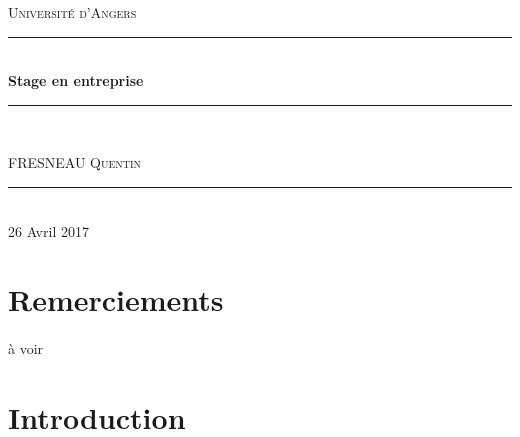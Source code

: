 \documentclass[a4paper,12pt]{extarticle}
\newcommand{\HRule}{\rule{\linewidth}{0.5mm}}
\begin{document}
\begin{titlepage}
  \begin{sffamily}
  \begin{center}


    \textsc{\LARGE Université d'Angers}\\[2cm]

   

    \HRule \\[0.4cm]
    { \huge \bfseries Stage en entreprise}{\bfseries  \\[0.4cm] }

    \HRule \\[2cm]
    

    \begin{minipage}{0.4\textwidth}
      \begin{flushleft} \large
        FRESNEAU \textsc{Quentin}
      \end{flushleft}
    \end{minipage}
    

    \vfill
    \HRule\\[2cm]
    {\large 26 Avril 2017}

  \end{center}
  \end{sffamily}
\end{titlepage}
\clearpage

\tableofcontents

\clearpage

\section{Remerciements}

\paragraph{}
à voir\\

\clearpage

\section{Introduction}
\end{document}
